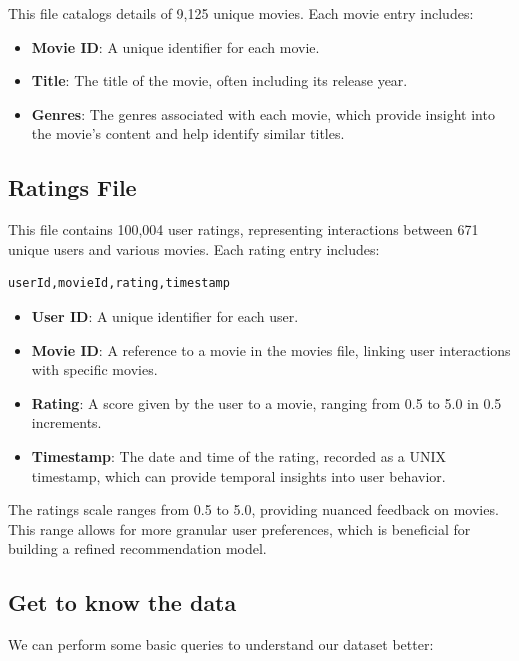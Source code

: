 \documentclass{article}
\begin{document}
This file catalogs details of 9,125 unique movies. Each movie entry includes:

\begin{itemize}
    \item \textbf{Movie ID}: A unique identifier for each movie.
    \item \textbf{Title}: The title of the movie, often including its release year.
    \item \textbf{Genres}: The genres associated with each movie, which provide insight into the movie's content and help identify similar titles.
\end{itemize}

\subsection{Ratings File}
This file contains 100,004 user ratings, representing interactions between 671 unique users and various movies. Each rating entry includes:

\begin{verbatim}
userId,movieId,rating,timestamp
\end{verbatim}

\begin{itemize}
    \item \textbf{User ID}: A unique identifier for each user.
    \item \textbf{Movie ID}: A reference to a movie in the movies file, linking user interactions with specific movies.
    \item \textbf{Rating}: A score given by the user to a movie, ranging from 0.5 to 5.0 in 0.5 increments.
    \item \textbf{Timestamp}: The date and time of the rating, recorded as a UNIX timestamp, which can provide temporal insights into user behavior.
\end{itemize}

The ratings scale ranges from 0.5 to 5.0, providing nuanced feedback on movies. This range allows for more granular user preferences, which is beneficial for building a refined recommendation model.

\subsection{Get to know the data}

We can perform some basic queries to understand our dataset better: 
\end{document}
